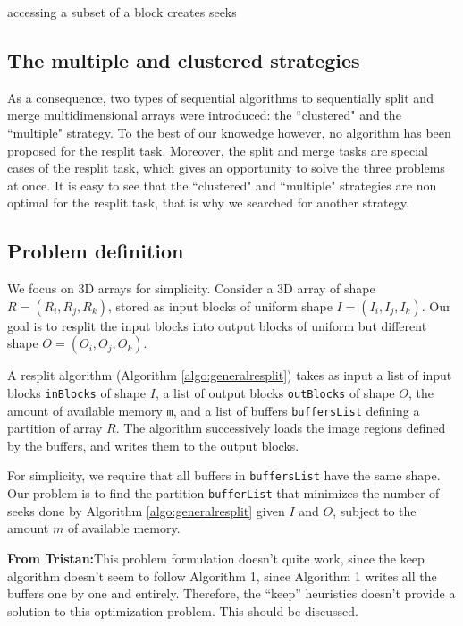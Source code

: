 \documentclass[conference]{IEEEtran}
\newcommand{\tristan}[1]{\color{orange}\textbf{From Tristan:}#1\color{black}}
\begin{document}
accessing a subset of a block creates seeks

\subsection{The multiple and clustered strategies}

As a consequence, two types of sequential algorithms to sequentially split and merge
multidimensional arrays were introduced: the ``clustered" and the ``multiple" strategy.
To the best of our knowedge however, no  algorithm has been proposed for the resplit task.
Moreover, the split and merge tasks
are special cases of the resplit task, which gives an opportunity to solve
the three problems at once. It is easy to see that the ``clustered" and
``multiple" strategies are non optimal for the resplit task, that is why we
searched for another strategy.

\subsection{Problem definition}

We focus on 3D arrays for simplicity. Consider a 3D array of shape $R =
(R_i, R_j, R_k)$, stored as input blocks of uniform shape $I =
(I_i, I_j, I_k)$. Our goal is to resplit the input blocks into output
blocks of uniform but different shape $O = (O_i, O_j, O_k)$.

A resplit algorithm (Algorithm \ref{algo:generalresplit}) takes as input a
list of input blocks \texttt{inBlocks} of shape $I$, a list of output
blocks \texttt{outBlocks} of shape $O$, the amount of available memory
\texttt{m}, and a list of buffers \texttt{buffersList} defining a partition
of array $R$. The algorithm successively loads the image regions defined by
the buffers, and writes them to the output blocks.

For simplicity, we require that all buffers in \texttt{buffersList} have
the same shape. Our problem is to find the partition \texttt{bufferList}
that minimizes the number of seeks done by Algorithm
\ref{algo:generalresplit} given $I$ and $O$, subject to the amount $m$
of available memory.

\tristan{This problem formulation doesn't quite work, since the keep
algorithm doesn't seem to follow Algorithm 1, since Algorithm 1 writes all
the buffers one by one and entirely. Therefore, the ``keep'' heuristics doesn't
provide a solution to this optimization problem. This should be discussed.}
\end{document}
